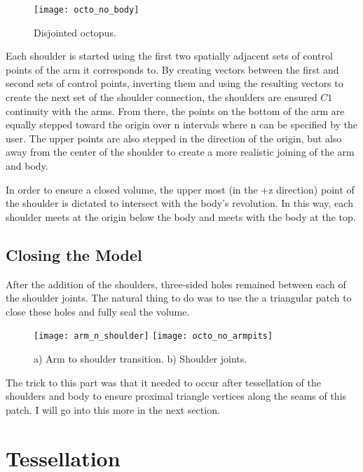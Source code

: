 \documentclass[twocolumn]{article}
\begin{document}
\begin{figure}[h!]
\begin{center}
\texttt{[image: octo\_no\_body]}
\caption{Disjointed octopus.}
\end{center}
\end{figure}

Each shoulder is started using the first two spatially adjacent sets of control points of the arm it corresponds to. By creating vectors between the first and second sets of control points, inverting them and using the resulting vectors to create the next set of the shoulder connection, the shoulders are ensured $C1$ continuity with the arms. From there, the points on the bottom of the arm are equally stepped toward the origin over n intervals where n can be specified by the user. The upper points are also stepped in the direction of the origin, but also away from the center of the shoulder to create a more realistic joining of the arm and body. 

In order to ensure a closed volume, the upper most (in the +z direction) point of the shoulder is dictated to intersect with the body's revolution. In this way, each shoulder meets at the origin below the body and meets with the body at the top. 

\subsection{Closing the Model}

After the addition of the shoulders, three-sided holes remained between each of the shoulder joints. The natural thing to do was to use the a triangular patch to close these holes and fully seal the volume. 

\begin{figure}[h!]
\begin{center}
\texttt{[image: arm\_n\_shoulder]}
\texttt{[image: octo\_no\_armpits]}
\caption{a) Arm to shoulder transition. b) Shoulder joints.}
\end{center}
\end{figure}

The trick to this part was that it needed to occur after tessellation of the shoulders and body to ensure proximal triangle vertices along the seams of this patch. I will go into this more in the next section. 

\section{Tessellation}
\end{document}
